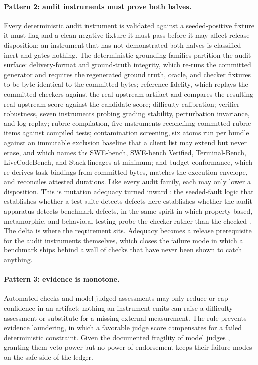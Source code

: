 \documentclass[11pt]{article}
\begin{document}
\paragraph{Pattern 2: audit instruments must prove both halves.}
Every deterministic audit instrument is validated against a seeded-positive fixture it must flag and a clean-negative fixture it must pass before it may affect release disposition; an instrument that has not demonstrated both halves is classified inert and gates nothing. The deterministic grounding families partition the audit surface: delivery-format and ground-truth integrity, which re-runs the committed generator and requires the regenerated ground truth, oracle, and checker fixtures to be byte-identical to the committed bytes; reference fidelity, which replays the committed checkers against the real upstream artifact and compares the resulting real-upstream score against the candidate score; difficulty calibration; verifier robustness, seven instruments probing grading stability, perturbation invariance, and log replay; rubric compilation, five instruments reconciling committed rubric items against compiled tests; contamination screening, six atoms run per bundle against an immutable exclusion baseline that a client list may extend but never erase, and which names the SWE-bench, SWE-bench Verified, Terminal-Bench, LiveCodeBench, and Stack lineages at minimum; and budget conformance, which re-derives task bindings from committed bytes, matches the execution envelope, and reconciles attested durations. Like every audit family, each may only lower a disposition. This is mutation adequacy turned inward \citep{demillo1978hints, jia2011analysis}: the seeded-fault logic that establishes whether a test suite detects defects \citep{zhu1997software} here establishes whether the audit apparatus detects benchmark defects, in the same spirit in which property-based, metamorphic, and behavioral testing probe the checker rather than the checked \citep{claessen2000quickcheck, chen2018metamorphic, ribeiro2020beyond}. The delta is where the requirement sits. Adequacy becomes a release prerequisite for the audit instruments themselves, which closes the failure mode in which a benchmark ships behind a wall of checks that have never been shown to catch anything.

\paragraph{Pattern 3: evidence is monotone.}
Automated checks and model-judged assessments may only reduce or cap confidence in an artifact; nothing an instrument emits can raise a difficulty assessment or substitute for a missing external measurement. The rule prevents evidence laundering, in which a favorable judge score compensates for a failed deterministic constraint. Given the documented fragility of model judges \citep{norman2026reliability, gupta2026conformal}, granting them veto power but no power of endorsement keeps their failure modes on the safe side of the ledger.
\end{document}
